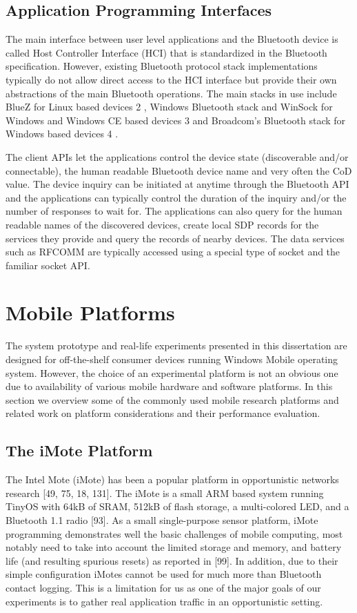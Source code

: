 \subsection{Application Programming Interfaces}

The main interface between user level applications and the Bluetooth device is
called Host Controller Interface (HCI) that is standardized in the Bluetooth specification. However, existing Bluetooth protocol stack implementations typically do not
allow direct access to the HCI interface but provide their own abstractions of the main Bluetooth operations. The main stacks in use include BlueZ for Linux based devices 2 ,
Windows Bluetooth stack and WinSock for Windows and Windows CE based devices 3 and Broadcom's Bluetooth stack for Windows based devices 4 .

The client APIs let the applications control the device state (discoverable and/or connectable), the human readable Bluetooth device name and very often the CoD
value. The device inquiry can be initiated at anytime through the Bluetooth API and the applications can typically control the duration of the inquiry and/or the number of
responses to wait for. The applications can also query for the human readable names of the discovered devices, create local SDP records for the services they provide and
query the records of nearby devices. The data services such as RFCOMM are typically accessed using a special type of socket and the familiar socket API.

\section{Mobile Platforms}
The system prototype and real-life experiments presented in this dissertation are
designed for off-the-shelf consumer devices running Windows Mobile operating system. However, the choice of an experimental platform is not an obvious one due to
availability of various mobile hardware and software platforms. In this section we
overview some of the commonly used mobile research platforms and related work on
platform considerations and their performance evaluation.

\subsection{The iMote Platform}

The Intel Mote (iMote) has been a popular platform in opportunistic networks research [49, 75, 18, 131]. The iMote is a small ARM based system running TinyOS
with 64kB of SRAM, 512kB of flash storage, a multi-colored LED, and a Bluetooth 1.1
radio [93]. As a small single-purpose sensor platform, iMote programming demonstrates well the basic challenges of mobile computing, most notably need to take into
account the limited storage and memory, and battery life (and resulting spurious resets) as reported in [99]. In addition, due to their simple configuration iMotes cannot
be used for much more than Bluetooth contact logging. This is a limitation for us as one of the major goals of our experiments is to gather real application traffic in an
opportunistic setting.

